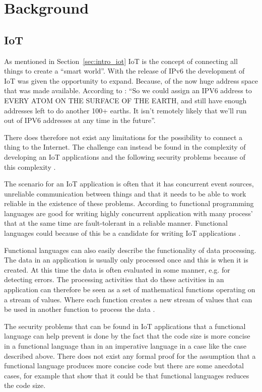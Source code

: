 \chapter{Background}

\section{IoT}
As mentioned in Section~\ref{sec:intro_iot} IoT is the concept of connecting all things to create a “smart world”. With the release of IPv6 the development of IoT was given the opportunity to expand. Because, of the now huge address space that was made available.  According to \citet{leibson_2008}: “So we could assign an IPV6 address to EVERY ATOM ON THE SURFACE OF THE EARTH, and still have enough addresses left to do another 100+ earths.  It isn’t remotely likely that we’ll run out of IPV6 addresses at any time in the future”.

There does therefore not exist any limitations for the possibility to connect a thing to the Internet. The challenge can instead be found in the complexity of developing an IoT applications and the following security problems because of this complexity \citep{sivieri2012wsn}.

The scenario for an IoT application is often that it has concurrent event sources, unreliable communication between things and that it needs to be able to work reliable in the existence of these problems. According to \citet{armstrong2010erlang} functional programming languages are good for writing highly concurrent application with many process’ that at the same time are fault-tolerant in a reliable manner. Functional languages could because of this be a candidate for writing IoT applications \citep{haenisch2016case}. 

Functional languages can also easily describe the functionality of data processing. The data in an application is usually only processed once and this is when it is created. At this time the data is often evaluated in some manner, e.g. for detecting errors. The processing activities that do these activities in an application can therefore be seen as a set of mathematical functions operating on a stream of values. Where each function creates a new stream of values that can be used in another function to process the data \citep{haenisch2016case}. 

The security problems that can be found in IoT applications that a functional language can help prevent is done by the fact that the code size is more concise in a functional language than in an imperative language in a case like the case described above. There does not exist any formal proof for the assumption that a functional language produces more concise code but there are some anecdotal cases, for example \citet{carmack2013} that show that it could be that functional languages reduces the code size.

